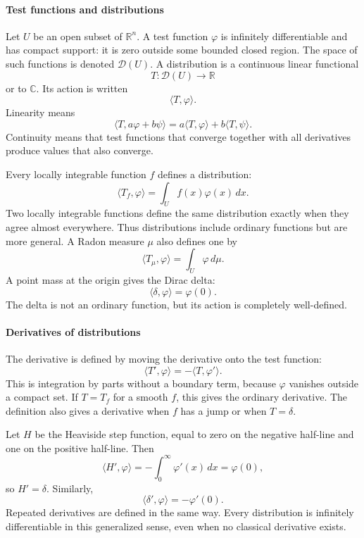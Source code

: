 \paragraph{Test functions and distributions}

Let $U$ be an open subset of $\mathbb R^n$. A test function $\varphi$ is infinitely differentiable and has compact support: it is zero outside some bounded closed region. The space of such functions is denoted $\mathcal D(U)$. A distribution is a continuous linear functional
\[
 T:\mathcal D(U)\longrightarrow\mathbb R
\]
or to $\mathbb C$. Its action is written
\[
 \langle T,\varphi\rangle.
\]
Linearity means
\[
 \langle T,a\varphi+b\psi\rangle
 =a\langle T,\varphi\rangle+b\langle T,\psi\rangle.
\]
Continuity means that test functions that converge together with all derivatives produce values that also converge.

Every locally integrable function $f$ defines a distribution:
\[
 \langle T_f,\varphi\rangle
 =\int_U f(x)\varphi(x)\,dx.
\]
Two locally integrable functions define the same distribution exactly when they agree almost everywhere. Thus distributions include ordinary functions but are more general. A Radon measure $\mu$ also defines one by
\[
 \langle T_\mu,\varphi\rangle=\int_U\varphi\,d\mu.
\]
A point mass at the origin gives the Dirac delta:
\[
 \langle\delta,\varphi\rangle=\varphi(0).
\]
The delta is not an ordinary function, but its action is completely well-defined. \cite{distribution_theory_ref1,distribution_theory_ref5}

\paragraph{Derivatives of distributions}

The derivative is defined by moving the derivative onto the test function:
\[
 \langle T',\varphi\rangle=-\langle T,\varphi'\rangle.
\]
This is integration by parts without a boundary term, because $\varphi$ vanishes outside a compact set. If $T=T_f$ for a smooth $f$, this gives the ordinary derivative. The definition also gives a derivative when $f$ has a jump or when $T=\delta$.

Let $H$ be the Heaviside step function, equal to zero on the negative half-line and one on the positive half-line. Then
\[
 \langle H',\varphi\rangle
 =-\int_0^\infty\varphi'(x)\,dx
 =\varphi(0),
\]
so $H'=\delta$. Similarly,
\[
 \langle\delta',\varphi\rangle=-\varphi'(0).
\]
Repeated derivatives are defined in the same way. Every distribution is infinitely differentiable in this generalized sense, even when no classical derivative exists.

